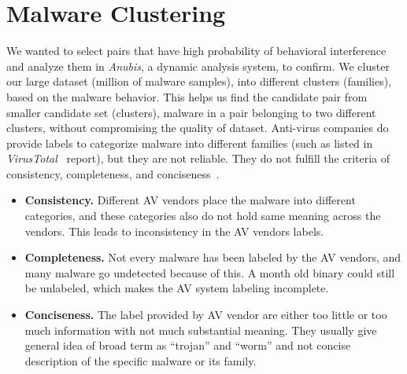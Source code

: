 \section{Malware Clustering}
\label{sec:Malware Clustering}
We wanted to select pairs that have high probability of behavioral interference and analyze them in \emph{Anubis}, a dynamic analysis system, to confirm.
We cluster our large dataset (million of malware samples), into different clusters (families), based on the malware behavior.
This helps us find the candidate pair from smaller candidate set (clusters), malware in a pair belonging to two different clusters, without compromising the quality of dataset.
Anti-virus companies do provide labels to categorize malware into different families (such as listed in \emph{VirusTotal}~\cite[]{virustotal} report), but they are not reliable.
They do not fulfill the criteria of consistency, completeness, and conciseness~\cite[]{bailey}.\\
\begin{itemize}
\item \textbf{Consistency.} Different AV vendors place the malware into different categories, and these categories also do not hold same meaning across the vendors.
This leads to inconsistency in the AV vendors labels.
\item \textbf{Completeness.} Not every malware has been labeled by the AV vendors, and many malware go undetected because of this.
A month old binary could still be unlabeled, which makes the AV system labeling incomplete.
\item \textbf{Conciseness.} The label provided by AV vendor are either too little or too much information with not much substantial meaning.
They usually give general idea of broad term as ``trojan'' and ``worm'' and not concise description of the specific malware or its family.
\end{itemize}
